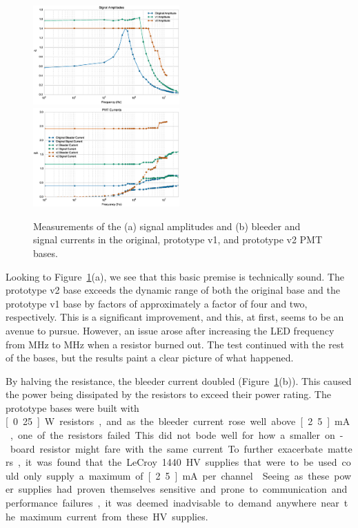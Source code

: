 \begin{figure}[h]
	\centerline{
		\mbox{\includegraphics[width=0.5\textwidth]{figures/pmtupgrade/Test_v2_Amp.eps} \includegraphics[width=0.5\textwidth]{figures/pmtupgrade/Test_v2_Current.eps}}}
	\caption{Measurements of the (a) signal amplitudes and (b) bleeder and signal currents in the original, prototype v1, and prototype v2 PMT bases.}
	\label{fig:test-v2}
\end{figure}

Looking to Figure~\ref{fig:test-v2}(a), we see that this basic premise is technically sound. The prototype v2 base exceeds the dynamic range of both the original base and the prototype v1 base by factors of approximately a factor of four and two, respectively. This is a significant improvement, and this, at first, seems to be an avenue to pursue. However, an issue arose after increasing the LED frequency from \unit[13]{MHz} to \unit[14]{MHz} when a resistor burned out. The test continued with the rest of the bases, but the results paint a clear picture of what happened. 

By halving the resistance, the bleeder current doubled (Figure~\ref{fig:test-v2}(b)). This caused the power being dissipated by the resistors to exceed their power rating. The prototype bases were built with \unit[0.25]{W} resistors, and as the bleeder current rose well above \unit[2.5]{mA}, one of the resistors failed. This did not bode well for how a smaller on-board resistor might fare with the same current.

To further exacerbate matters, it was found that the LeCroy 1440 HV supplies that were to be used could only supply a maximum of \unit[2.5]{mA} per channel~\cite{lecroy:1440}. Seeing as these power supplies had proven themselves sensitive and prone to communication and performance failures, it was deemed inadvisable to demand anywhere near the maximum current from these HV supplies.

